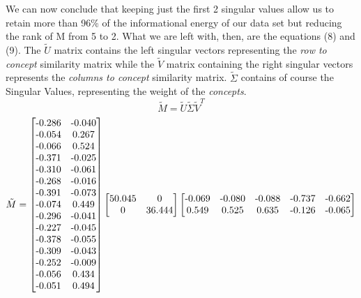 \documentclass[10pt]{article}
\theoremstyle{plain}
\theoremstyle{definition}
\begin{document}
We can now conclude that keeping just the first 2 singular values allow us to retain more than 96\% of the informational energy of our data set but reducing the rank of M from 5 to 2. 
\newpage
What we are left with, then, are the equations (8) and (9). The $\tilde{U}$ matrix contains the left singular vectors representing the \textit{row to concept} similarity matrix while the $\tilde{V}$ matrix containing the right singular vectors represents the \textit{columns to concept} similarity matrix. $\tilde{\Sigma}$ contains of course the Singular Values, representing the weight of the \textit{concepts}.
\begin{equation}
\tilde{M} = \tilde{U} \tilde{\Sigma} \tilde{V}^T
\end{equation}
\begin{equation}
\tilde{M} =
\begin{bmatrix}
$-0.286$ & $-0.040$ \\ 
$-0.054$ & $0.267$ \\ 
$-0.066$ & $0.524$ \\ 
$-0.371$ & $-0.025$ \\ 
$-0.310$ & $-0.061$ \\ 
$-0.268$ & $-0.016$ \\ 
$-0.391$ & $-0.073$ \\ 
$-0.074$ & $0.449$ \\ 
$-0.296$ & $-0.041$ \\ 
$-0.227$ & $-0.045$ \\ 
$-0.378$ & $-0.055$ \\ 
$-0.309$ & $-0.043$ \\ 
$-0.252$ & $-0.009$ \\ 
$-0.056$ & $0.434$ \\ 
$-0.051$ & $0.494$ \\ 
\end{bmatrix} 
\begin{bmatrix}
$50.045$ & $0$ \\ 
$0$ & $36.444$ \\ 
\end{bmatrix}%
\begin{bmatrix}
$-0.069$ & $-0.080$ & $-0.088$ & $-0.737$ & $-0.662$ \\ 
$0.549$ & $0.525$ & $0.635$ & $-0.126$ & $-0.065$ \\ 
\end{bmatrix}
\end{equation}
\end{document}
